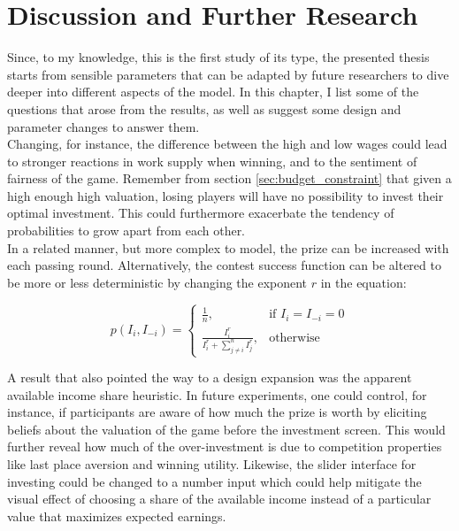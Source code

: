 \thispagestyle{fancy}
\chapter{Discussion and Further Research}
\label{ch:discussion}

Since, to my knowledge, this is the first study of its type, the presented thesis starts from sensible parameters that can be adapted by future researchers to dive deeper into different aspects of the model. In this chapter, I list some of the questions that arose from the results, as well as suggest some design and parameter changes to answer them.\\

Changing, for instance, the difference between the high and low wages could lead to stronger reactions in work supply when winning, and to the sentiment of fairness of the game. Remember from section \ref{sec:budget_constraint} that given a high enough high valuation, losing players will have no possibility to invest their optimal investment. This could furthermore exacerbate the tendency of probabilities to grow apart from each other.\\

In a related manner, but more complex to model, the prize can be increased with each passing round. Alternatively, the contest success function can be altered to be more or less deterministic by changing the exponent $r$ in the equation:

\begin{equation}
    p(I_i,I_{-i}) =
\begin{cases}
    \frac{1}{n},& \text{if } I_i = I_{-i} = 0\\
    \frac{I_i^r}{I_i^r + \sum_{j\neq i}^n I_{j}^r},              & \text{otherwise}
\end{cases}
\label{eq:csf_exp}    
\end{equation}

A result that also pointed the way to a design expansion was the apparent available income share heuristic. In future experiments, one could control, for instance, if participants are aware of how much the prize is worth by eliciting beliefs about the valuation of the game before the investment screen. This would further reveal how much of the over-investment is due to competition properties like last place aversion and winning utility. Likewise, the slider interface for investing could be changed to a number input which could help mitigate the visual effect of choosing a share of the available income instead of a particular value that maximizes expected earnings.\\

